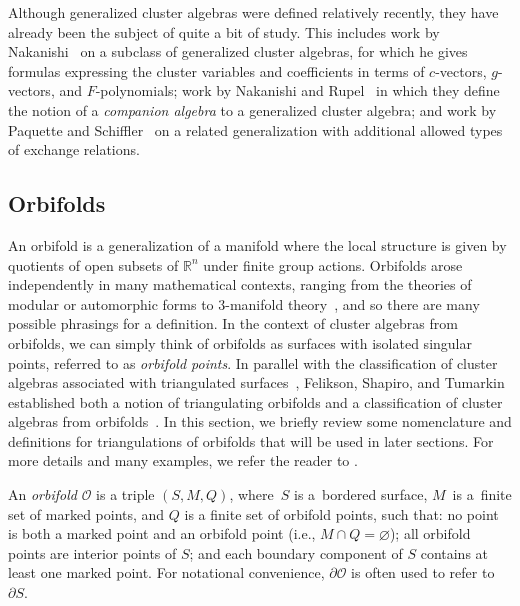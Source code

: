 Although generalized cluster algebras were defined relatively recently, they have already been the subject of quite a bit of study. This includes work by Nakanishi~\cite{Nakanishi} on a subclass of generalized cluster algebras, for which he gives formulas expressing the cluster variables and coefficients in terms of $c$-vectors, $g$-vectors, and $F$-polynomials; work by Nakanishi and Rupel~\cite{Nakanishi-Rupel} in which they define the notion of a \emph{companion algebra} to a generalized cluster algebra; and work by Paquette and Schiffler~\cite{Paquette-Schiffler} on a related generalization with additional allowed types of exchange relations.

\subsection{Orbifolds}\label{sec:orbifolds}

An orbifold is a generalization of a manifold where the local structure is given by quotients of open subsets of $\mathbb{R}^n$ under finite group actions. Orbifolds arose independently in many mathematical contexts, ranging from the theories of modular or automorphic forms \cite{Satake} to $3$-manifold theory~\cite{Thurston}, and so there are many possible phrasings for a definition. In the context of cluster algebras from orbifolds, we can simply think of orbifolds as surfaces with isolated singular points, referred to as \emph{orbifold points}.
In parallel with the classification of cluster algebras associated with triangulated surfaces~\cite{FST-triangulatedSurfaces, FT-II}, Felikson, Shapiro, and Tumarkin established both a notion of triangulating orbifolds and a classification of cluster algebras from orbifolds~\cite{FST-orbTriang}. In this section, we briefly review some nomenclature and definitions for triangulations of orbifolds that will be used in later sections. For more details and many examples, we refer the reader to \cite[Section~4]{FST-orbTriang}.

\begin{Definition}
An \emph{orbifold} $\mathcal{O}$ is a triple $(S,M,Q)$, where~$S$ is a~bordered surface, $M$~is a~finite set of marked points, and $Q$ is a finite set of orbifold points, such that: no point is both a marked point and an orbifold point (i.e., $M \cap Q = \varnothing$); all orbifold points are interior points of $S$; and each boundary component of $S$ contains at least one marked point. For notational convenience, $\partial \mathcal{O}$ is often used to refer to $\partial S$.
\end{Definition}

